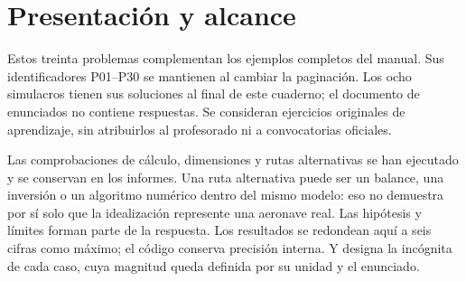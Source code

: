 
\renewcommand{\studiumvolumetype}{problemas}

\frontmatter
\studiumreadingguide
\chapter*{Presentación y alcance}
Estos treinta problemas complementan los ejemplos completos del manual. Sus identificadores P01–P30 se mantienen al cambiar la paginación. Los ocho simulacros tienen sus soluciones al final de este cuaderno; el documento de enunciados no contiene respuestas. Se consideran ejercicios originales de aprendizaje, sin atribuirlos al profesorado ni a convocatorias oficiales.

Las comprobaciones de cálculo, dimensiones y rutas alternativas se han ejecutado y se conservan en los informes. Una ruta alternativa puede ser un balance, una inversión o un algoritmo numérico dentro del mismo modelo: eso no demuestra por sí solo que la idealización represente una aeronave real. Las hipótesis y límites forman parte de la respuesta. Los resultados se redondean aquí a seis cifras como máximo; el código conserva precisión interna. Y designa la incógnita de cada caso, cuya magnitud queda definida por su unidad y el enunciado.
\tableofcontents
\mainmatter

